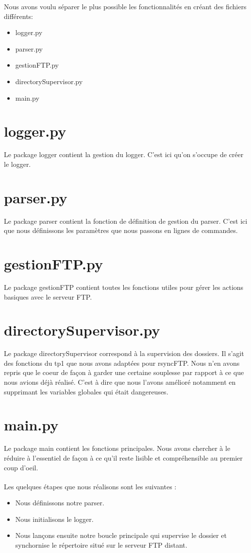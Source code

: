 Nous avons voulu séparer le plus possible les fonctionnalités en créant des fichiers différents: 
\begin{itemize}
\item logger.py
\item parser.py
\item gestionFTP.py
\item directorySupervisor.py
\item main.py
\end{itemize}

\section{logger.py}	

Le package logger contient la gestion du logger. C'est ici qu'on s'occupe de créer le logger.

\section{parser.py}

Le package parser contient la fonction de définition de gestion du parser. 
C'est ici que nous définissons les paramètres que nous passons en lignes de commandes.

\section{gestionFTP.py}

Le package gestionFTP contient toutes les fonctions utiles pour gérer les actions basiques avec le serveur FTP.

\section{directorySupervisor.py}

Le package directorySupervisor correspond à la supervision des dossiers. 
Il s'agit des fonctions du tp1 que nous avons adaptées pour rsyncFTP. 
Nous n'en avons repris que le coeur de façon à garder une certaine souplesse par rapport à ce que nous avions déjà réalisé.
C'est à dire que nous l'avons amélioré notamment en supprimant les variables globales qui était dangereuses.

\section{main.py}

Le package main contient les fonctions principales. 
Nous avons chercher à le réduire à l'essentiel de façon à ce qu'il reste lisible et compréhensible au premier coup d'oeil.\\
\\
Les quelques étapes que nous réalisons sont les suivantes :
\begin{itemize}
\item Nous définissons notre parser.
\item Nous initialisons le logger.
\item Nous lançons ensuite notre boucle principale qui supervise le dossier et synchornise le répertoire situé sur le serveur FTP distant.
\end{itemize}
